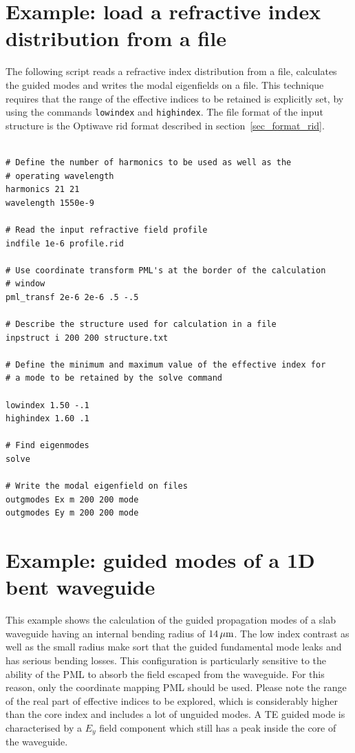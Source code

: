 \section[Load refractive index distribution]{Example: load a refractive index distribution from a file}
The following script reads a refractive index distribution from
a file, calculates the guided modes and writes the modal eigenfields on a file. This technique requires that the range of the
effective indices to be retained is explicitly set, by using the commands \lstinline!lowindex! and \lstinline!highindex!. The file format of the input structure is the Optiwave rid format described in section~\ref{sec_format_rid}.
\begin{lstlisting}

# Define the number of harmonics to be used as well as the 
# operating wavelength
harmonics 21 21
wavelength 1550e-9

# Read the input refractive field profile
indfile 1e-6 profile.rid

# Use coordinate transform PML's at the border of the calculation 
# window
pml_transf 2e-6 2e-6 .5 -.5

# Describe the structure used for calculation in a file
inpstruct i 200 200 structure.txt

# Define the minimum and maximum value of the effective index for 
# a mode to be retained by the solve command

lowindex 1.50 -.1
highindex 1.60 .1

# Find eigenmodes
solve

# Write the modal eigenfield on files
outgmodes Ex m 200 200 mode
outgmodes Ey m 200 200 mode
\end{lstlisting}

\section[Modes of a 1D bent waveguide]{Example: guided modes of a 1D bent waveguide}
This example shows the calculation of the guided propagation modes of a slab waveguide having an internal bending radius of $14\,\mathrm{\mu m}$. The low index contrast as well as the small radius make sort that the guided fundamental mode leaks and has serious bending losses. This configuration is particularly sensitive to the ability of the PML to absorb the field escaped from the waveguide. For this reason, only the coordinate mapping PML should be used.
Please note the range of the real part of effective indices to be explored, which is considerably higher than the core index and includes a lot of unguided modes. A TE guided mode is characterised by a $E_y$ field component which still has a peak inside the core of the waveguide.

